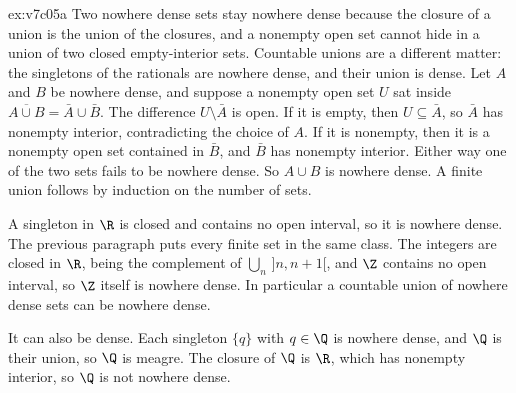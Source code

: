 \begin{solution}{ex:v7c05a}
\idea Two nowhere dense sets stay nowhere dense because the closure of a union is the union of the closures, and a nonempty open set cannot hide in a union of two closed empty-interior sets. Countable unions are a different matter: the singletons of the rationals are nowhere dense, and their union is dense.
\writeup Let $A$ and $B$ be nowhere dense, and suppose a nonempty open set $U$ sat inside $\overline{A\cup B}=\bar A\cup\bar B$. The difference $U\setminus\bar A$ is open. If it is empty, then $U\subseteq\bar A$, so $\bar A$ has nonempty interior, contradicting the choice of $A$. If it is nonempty, then it is a nonempty open set contained in $\bar B$, and $\bar B$ has nonempty interior. Either way one of the two sets fails to be nowhere dense. So $A\cup B$ is nowhere dense. A finite union follows by induction on the number of sets.

A singleton in $\R$ is closed and contains no open interval, so it is nowhere dense. The previous paragraph puts every finite set in the same class. The integers are closed in $\R$, being the complement of $\bigcup_n\,]n,n+1[$, and $\Z$ contains no open interval, so $\Z$ itself is nowhere dense. In particular a countable union of nowhere dense sets can be nowhere dense.

It can also be dense. Each singleton $\{q\}$ with $q\in\Q$ is nowhere dense, and $\Q$ is their union, so $\Q$ is meagre. The closure of $\Q$ is $\R$, which has nonempty interior, so $\Q$ is not nowhere dense.
\end{solution}

